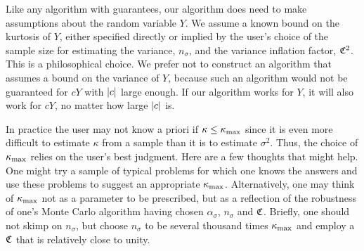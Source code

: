 \documentclass{iitthesis}
\theoremstyle{definition}
\begin{document}

Like any algorithm with guarantees, our algorithm does need to make assumptions about the random variable $Y$.  We assume a known bound on the kurtosis of $Y$, either specified directly or implied by the user's choice of the sample size for estimating the variance, $n_\sigma$, and the variance inflation factor, $\mathfrak{C}^2$.  This is a philosophical choice.  We prefer not to construct an algorithm that assumes a bound on the variance of 
$Y$, because such an algorithm would not be guaranteed for $cY$ with $\left \lvert c \right \rvert$ large enough.  If our algorithm works for $Y$, it will also work for $cY$, no matter how large $\left \lvert c \right \rvert$ is. 

In practice the user may not know a priori if $\kappa \le \kappa_{\max}$ since it is even more difficult to estimate $\kappa$ from a sample than it is to estimate $\sigma^2$.  Thus, the choice of $\kappa_{\max}$ relies on the user's best judgment.  Here are a few thoughts that might help.  One might try a sample of typical problems for which one knows the answers and use these problems to suggest an appropriate $\kappa_{\max}$.  Alternatively, one may think of $\kappa_{\max}$ not as a parameter to be prescribed, but as a reflection of the robustness of one's Monte Carlo algorithm having chosen $\alpha_\sigma$, $n_\sigma$ and $\mathfrak{C}$. Briefly, one should not skimp on $n_\sigma$, but choose $n_\sigma$ to be several thousand times $\kappa_{\max}$ and employ a $\mathfrak{C}$ that is relatively close to unity. 
\end{document}
